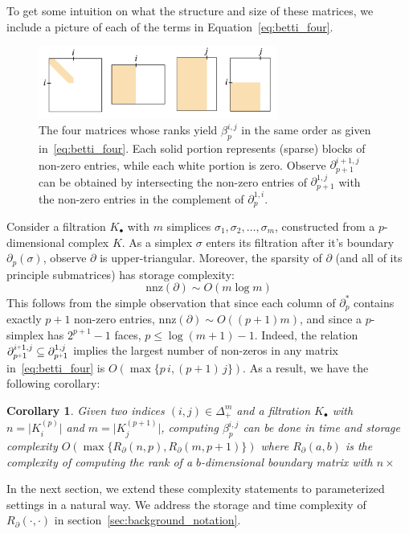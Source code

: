 \documentclass[10pt]{article}
\newcommand{\+}{%
	\raisebox{0.18ex}{\scaleobj{0.55}{+}}
}
\newtheorem{corollary}{Corollary}
\begin{document}
To get some intuition on what the structure and size of these matrices, we include a picture of each of the terms in Equation~\eqref{eq:betti_four}. 
\begin{figure}[!h]
	\centering
	\includegraphics[width=0.70\textwidth]{four_matrices}
	\caption{The four matrices whose ranks yield $\beta_p^{i,j}$ in the same order as given in~\eqref{eq:betti_four}. Each solid portion represents (sparse) blocks of non-zero entries, while each white portion is zero. Observe $\partial_{p+1}^{i+1, j}$ can be obtained by intersecting the non-zero entries of $\partial_{p+1}^{1,j}$ with the non-zero entries in the complement of $\partial_p^{1,i}$.  }
\end{figure}
Consider a filtration $K_\bullet$ with $m$ simplices $\sigma_1, \sigma_2, \dots, \sigma_m$, constructed from a $p$-dimensional complex $K$. As a simplex $\sigma$ enters its filtration after it's boundary $\partial_p(\sigma)$, observe $\partial$ is upper-triangular. Moreover, the sparsity of $\partial$ (and all of its principle submatrices) has storage complexity: 
\begin{equation}
	\mathrm{nnz}(\partial) \sim O(m \log m)
\end{equation} 
This follows from the simple observation that since each column of $\partial_p^\ast$ contains exactly $p+1$ non-zero entries, $\mathrm{nnz}(\partial) \sim O((p+1)m)$, and since a $p$-simplex has $2^{p+1} - 1$ faces, $p \leq \log(m + 1) - 1$. 
Indeed, the relation $\partial_{p\+1}^{i \+ 1, j} \subseteq \partial_{p\+1}^{1, j}$ implies the largest number of non-zeros in any matrix in~\eqref{eq:betti_four} is $O(\max\{p\, i, (p+1)\,j\})$.
As a result, we have the following corollary:
\begin{corollary}
	Given two indices $(i,j) \in \Delta_+^m$ and a filtration $K_\bullet$ with $n = \lvert K_{i}^{(p)} \rvert$ and $m = \lvert K_{j}^{(p+1)} \rvert$, computing $\beta_p^{i,j}$ can be done in time and storage complexity $O(\max\{R_\partial(n, p), R_\partial(m, p+1) \})$ where $R_\partial(a,b)$ is the complexity of computing the rank of a $b$-dimensional boundary matrix with $n \times $ 
\end{corollary} 
\noindent 
In the next section, we extend these complexity statements to parameterized settings in a natural way. We address the storage and time complexity of $R_\partial(\cdot, \cdot)$ in section~\ref{sec:background_notation}.
\end{document}
